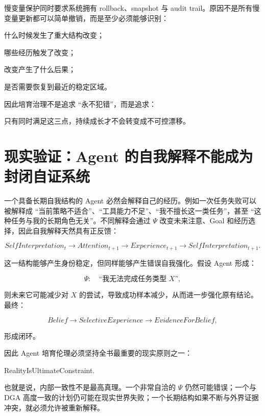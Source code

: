 慢变量保护同时要求系统拥有 rollback、snapshot 与 audit trail。原因不是所有慢变量更新都可以简单撤销，而是至少必须能够识别：

什么时候发生了重大结构改变；

哪些经历触发了改变；

改变产生了什么后果；

是否需要恢复到最近的稳定区域。

因此培育治理不是追求 ``永不犯错''，而是追求：

\begin{statementbox}
\centering
{}
\end{statementbox}

只有同时满足这三点，持续成长才不会转变成不可控漂移。

\section{现实验证：Agent 的自我解释不能成为封闭自证系统}

一个具备长期自我结构的 Agent 必然会解释自己的经历。例如一次任务失败可以被解释成 ``当前策略不适合''、``工具能力不足''、``我不擅长这一类任务''，甚至 ``这种任务与我的长期角色无关''。不同解释会通过 $\Psi$ 改变未来注意、Goal 和经历选择，因此自我解释天然具有正反馈：

\[
SelfInterpretation_t
\rightarrow
Attention_{t+1}
\rightarrow
Experience_{t+1}
\rightarrow
SelfInterpretation_{t+1}.
\]

这一结构能够产生身份稳定，但同样能够产生错误自我强化。假设 Agent 形成：

\[
\Psi:
\quad
\text{``我无法完成任务类型 }X\text{''},
\]

则未来它可能减少对 $X$ 的尝试，导致成功样本减少，从而进一步强化原有结论。最终：

\[
Belief
\rightarrow
SelectiveExperience
\rightarrow
EvidenceForBelief,
\]

形成闭环。

因此 Agent 培育伦理必须坚持全书最重要的现实原则之一：

\begin{statementbox}
RealityIsUltimateConstraint.
\end{statementbox}

也就是说，内部一致性不是最高真理。一个非常自洽的 $\Psi$ 仍然可能错误；一个与 DGA 高度一致的计划仍可能在现实世界失败；一个长期结构如果不断与外界证据冲突，就必须允许被重新解释。

